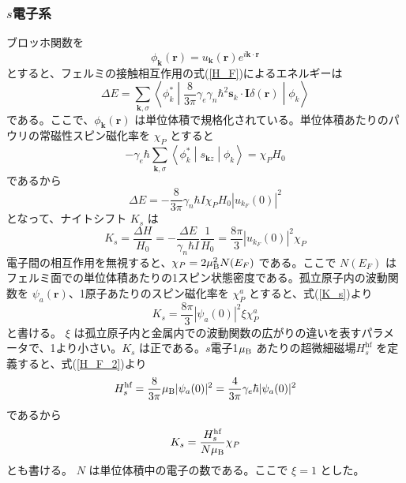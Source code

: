 \documentclass[11pt,a4j]{jreport}
\begin{document}
\subsubsection{$s$電子系}
ブロッホ関数を
\begin{equation}
  \phi_{\bm{k}}(\bm{r}) = u_{\bm{k}}(\bm{r}) e^{i \bm{k} \cdot \bm{r}}
\end{equation}
とすると、フェルミの接触相互作用の式(\ref{H_F})によるエネルギーは
\begin{equation}
  \Delta E = \sum_{\bm{k}, \sigma} \left\langle \phi_k^* \middle| \frac{8}{3 \pi} \gamma_e \gamma_n \hbar^2 \bm{s}_k \cdot \bm{I} \delta(\bm{r}) \middle| \phi_k \right\rangle
\end{equation}
である。ここで、\(\phi_{\bm{k}}(\bm{r})\) は単位体積で規格化されている。単位体積あたりのパウリの常磁性スピン磁化率を \(\chi_P\) とすると
\begin{equation}
  -\gamma_e\hbar \sum_{\bm{k},\sigma} \left\langle \phi_k^* \middle| s_{\bm{k}z} \middle| \phi_k \right\rangle = \chi_P H_0
\end{equation}
であるから
\begin{equation}
  \Delta E = -\frac{8}{3 \pi} \gamma_n \hbar I \chi_P H_0 | u_{k_F}(0) |^2
\end{equation}
となって、ナイトシフト \(K_s\) は
\begin{equation}
  K_s = \frac{\Delta H}{H_0} = - \frac{\Delta E}{\gamma_n \hbar I} \frac{1}{H_0} = \frac{8 \pi}{3} | u_{k_F}(0) |^2 \chi_P
  \label{K_s}
\end{equation}
電子間の相互作用を無視すると、\(\chi_P = 2 \mu_{\text B}^2 N(E_F)\) である。ここで \(N(E_F)\) はフェルミ面での単位体積あたりの1スピン状態密度である。孤立原子内の波動関数を \(\psi_a(\bm{r})\)、1原子あたりのスピン磁化率を \(\chi_P^a\) とすると、式(\ref{K_s})より
\begin{equation}
  K_s = \frac{8 \pi}{3} |\psi_a(0)|^2 \xi \chi_P^a
  \label{K_s_3}
\end{equation}
と書ける。 $\xi$ は孤立原子内と金属内での波動関数の広がりの違いを表すパラメータで、1より小さい。$K_s$ は正である。$s$電子1$\mu_{\text B}$ あたりの超微細磁場$H_{s}^{\text{hf}}$ を定義すると、式(\ref{H_F_2})より
\begin{equation}
  H_{s}^{\text{hf}} = \frac{8}{3 \pi} \mu_{\text B} |\psi_a(0)|^2 = \frac{4}{3 \pi} \gamma_e \hbar |\psi_a(0)|^2
  \label{K_s_N}
\end{equation}
であるから
\begin{equation}
  K_s = \frac{H_{s}^{\text{hf}}}{N \mu_{\text B}} \chi_P
  \label{K_s_2}
\end{equation}
とも書ける。 \(N\) は単位体積中の電子の数である。ここで \(\xi = 1\) とした。
\end{document}
